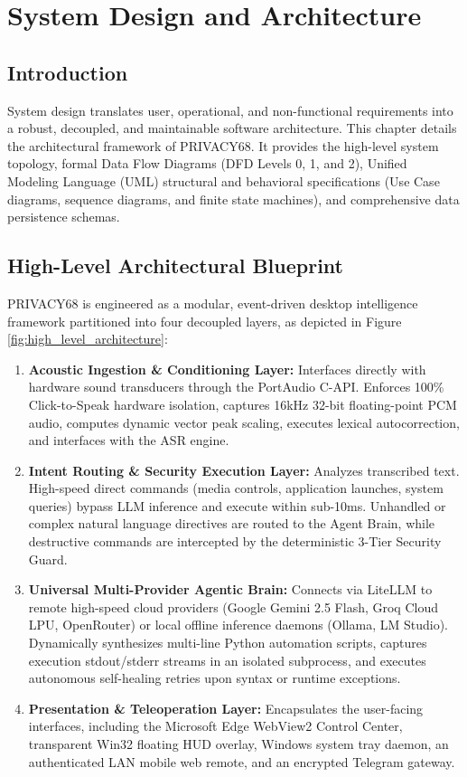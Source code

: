 \chapter{System Design and Architecture}
\label{ch:architecture}

\section{Introduction}
System design translates user, operational, and non-functional requirements into a robust, decoupled, and maintainable software architecture. This chapter details the architectural framework of PRIVACY68. It provides the high-level system topology, formal Data Flow Diagrams (DFD Levels 0, 1, and 2), Unified Modeling Language (UML) structural and behavioral specifications (Use Case diagrams, sequence diagrams, and finite state machines), and comprehensive data persistence schemas.

\section{High-Level Architectural Blueprint}
PRIVACY68 is engineered as a modular, event-driven desktop intelligence framework partitioned into four decoupled layers, as depicted in Figure \ref{fig:high_level_architecture}:
\begin{enumerate}
    \item \textbf{Acoustic Ingestion \& Conditioning Layer:} Interfaces directly with hardware sound transducers through the PortAudio C-API. Enforces 100\% Click-to-Speak hardware isolation, captures 16kHz 32-bit floating-point PCM audio, computes dynamic vector peak scaling, executes lexical autocorrection, and interfaces with the ASR engine.
    \item \textbf{Intent Routing \& Security Execution Layer:} Analyzes transcribed text. High-speed direct commands (media controls, application launches, system queries) bypass LLM inference and execute within sub-10ms. Unhandled or complex natural language directives are routed to the Agent Brain, while destructive commands are intercepted by the deterministic 3-Tier Security Guard.
    \item \textbf{Universal Multi-Provider Agentic Brain:} Connects via LiteLLM to remote high-speed cloud providers (Google Gemini 2.5 Flash, Groq Cloud LPU, OpenRouter) or local offline inference daemons (Ollama, LM Studio). Dynamically synthesizes multi-line Python automation scripts, captures execution stdout/stderr streams in an isolated subprocess, and executes autonomous self-healing retries upon syntax or runtime exceptions.
    \item \textbf{Presentation \& Teleoperation Layer:} Encapsulates the user-facing interfaces, including the Microsoft Edge WebView2 Control Center, transparent Win32 floating HUD overlay, Windows system tray daemon, an authenticated LAN mobile web remote, and an encrypted Telegram gateway.
\end{enumerate}

